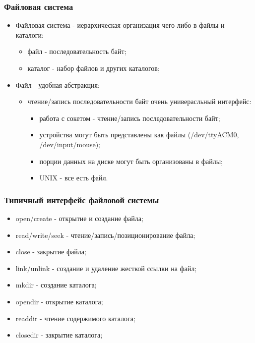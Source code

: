 \begin{frame}
\frametitle{Файловая система}
\begin{itemize}
  \item<1-> Файловая система - иерархическая организация чего-либо в файлы и каталоги:
    \begin{itemize}
      \item файл - последовательность байт;
      \item каталог - набор файлов и других каталогов;
    \end{itemize}
  \item<2-> Файл - удобная абстракция:
    \begin{itemize}
      \item чтение/запись последовательности байт очень универасльный интерфейс:
        \begin{itemize}
          \item работа с сокетом - чтение/запись последовательности байт;
          \item устройства могут быть представлены как файлы (/dev/ttyACM0, /dev/input/mouse);
          \item порции данных на диске могут быть организованы в файлы;
          \item UNIX - все есть файл.
        \end{itemize}
    \end{itemize}
\end{itemize}
\end{frame}

\begin{frame}
\frametitle{Типичный интерфейс файловой системы}
\begin{itemize}
  \item open/create - открытие и создание файла;
  \item read/write/seek - чтение/запись/позиционирование файла;
  \item close - закрытие файла;
  \item link/unlink - создание и удаление жесткой ссылки на файл;
  \item mkdir - создание каталога;
  \item opendir - открытие каталога;
  \item readdir - чтение содержимого каталога;
  \item closedir - закрытие каталога;
\end{itemize}
\end{frame}

